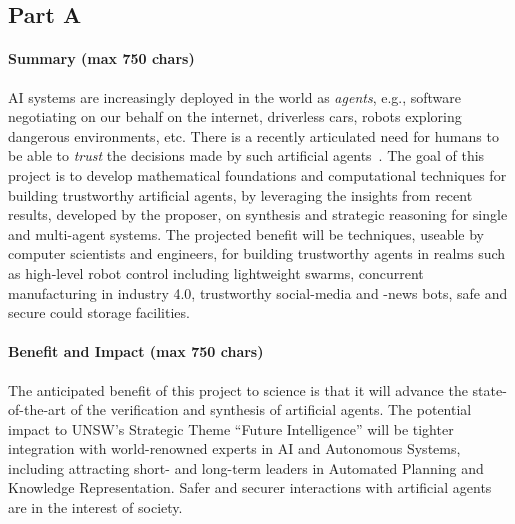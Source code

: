 \documentclass[a4paper,12pt,smallheadings]{scrartcl}
\begin{document}



% 
\subsection*{Part A}

\paragraph{Summary (max 750 chars)}

AI systems are increasingly deployed in the world as \emph{agents}, 
e.g., software negotiating on our behalf on the internet, driverless cars, 
robots exploring dangerous environments, etc. There is a recently articulated need for humans to 
be able to \emph{trust} the decisions made by such artificial agents~\cite{ACMStatement07}. 
The goal of this project is to develop mathematical foundations and computational techniques for building trustworthy artificial agents, by leveraging the insights from  
recent results, developed by the proposer, on synthesis and strategic reasoning for single and multi-agent systems. The projected benefit will be techniques, useable by computer scientists and engineers, for building trustworthy agents in realms such as high-level robot control including lightweight swarms, concurrent manufacturing in industry 4.0, trustworthy social-media and -news bots, safe and secure could storage facilities.

\paragraph{Benefit and Impact (max 750 chars)}

The anticipated benefit of this project to science is that it will advance the state-of-the-art of the verification and synthesis of artificial agents. The potential impact to UNSW's Strategic Theme ``Future Intelligence'' will be tighter integration with world-renowned experts in AI and Autonomous Systems, including attracting short- and long-term leaders in Automated Planning and Knowledge Representation. Safer and securer interactions with artificial agents are in the interest of society. 
\end{document}
